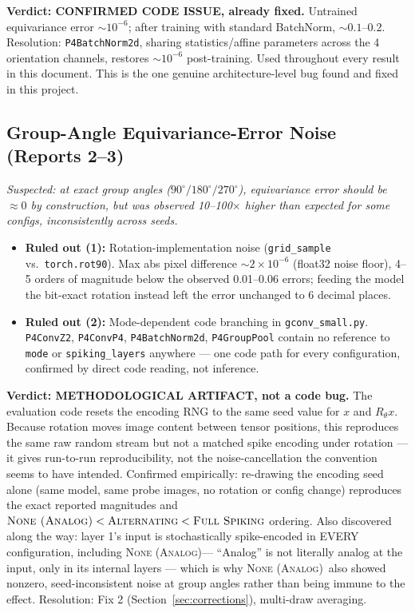 \documentclass[11pt]{article}
\newcommand{\None}{\textsc{None (Analog)}}
\newcommand{\Alternating}{\textsc{Alternating}}
\newcommand{\FullSpiking}{\textsc{Full Spiking}}
\begin{document}
\textbf{Verdict: CONFIRMED CODE ISSUE, already fixed.} Untrained equivariance error $\sim 10^{-6}$;
after training with standard BatchNorm, $\sim 0.1$--0.2. Resolution: \texttt{P4BatchNorm2d}, sharing
statistics/affine parameters across the 4 orientation channels, restores $\sim 10^{-6}$ post-training.
Used throughout every result in this document. This is the one genuine architecture-level bug found and
fixed in this project.

\subsection{Group-Angle Equivariance-Error Noise (Reports 2--3)}

\textit{Suspected: at exact group angles ($90^\circ/180^\circ/270^\circ$), equivariance error should be
$\approx 0$ by construction, but was observed 10--100$\times$ higher than expected for some configs,
inconsistently across seeds.}

\begin{itemize}[leftmargin=1.6em]
\item \textbf{Ruled out (1):} Rotation-implementation noise (\texttt{grid\_sample} vs.\
\texttt{torch.rot90}). Max abs pixel difference $\sim 2\times10^{-6}$ (float32 noise floor), 4--5 orders
of magnitude below the observed 0.01--0.06 errors; feeding the model the bit-exact rotation instead left
the error unchanged to 6 decimal places.
\item \textbf{Ruled out (2):} Mode-dependent code branching in \texttt{gconv\_small.py}. \texttt{P4ConvZ2},
\texttt{P4ConvP4}, \texttt{P4BatchNorm2d}, \texttt{P4GroupPool} contain no reference to \texttt{mode} or
\texttt{spiking\_layers} anywhere --- one code path for every configuration, confirmed by direct code
reading, not inference.
\end{itemize}

\textbf{Verdict: METHODOLOGICAL ARTIFACT, not a code bug.} The evaluation code resets the encoding RNG
to the same seed value for $x$ and $R_\theta x$. Because rotation moves image content between tensor
positions, this reproduces the same raw random stream but not a matched spike encoding under rotation
--- it gives run-to-run reproducibility, not the noise-cancellation the convention seems to have
intended. Confirmed empirically: re-drawing the encoding seed alone (same model, same probe images, no
rotation or config change) reproduces the exact reported magnitudes and $\None < \Alternating <
\FullSpiking$ ordering. Also discovered along the way: layer 1's input is stochastically spike-encoded
in EVERY configuration, including \None --- ``Analog'' is not literally analog at the input, only in
its internal layers --- which is why \None\ also showed nonzero, seed-inconsistent noise at group angles
rather than being immune to the effect. Resolution: Fix 2 (Section~\ref{sec:corrections}), multi-draw
averaging.
\end{document}
